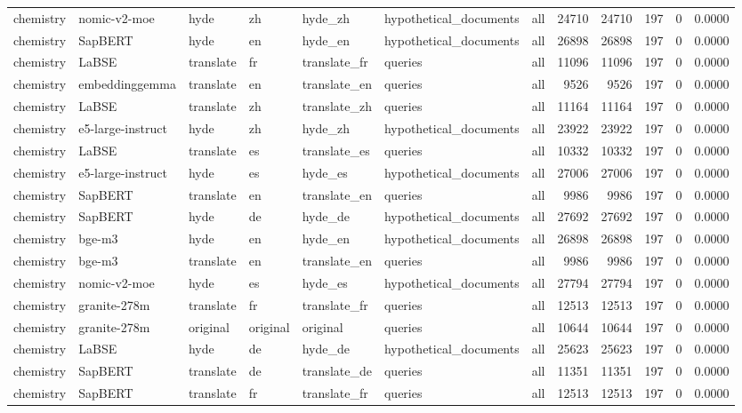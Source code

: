 \begin{tabular}{lllllllrrrrr}
chemistry & nomic-v2-moe & hyde & zh & hyde\_zh & hypothetical\_documents & all & 24710 & 24710 & 197 & 0 & 0.0000 \\
chemistry & SapBERT & hyde & en & hyde\_en & hypothetical\_documents & all & 26898 & 26898 & 197 & 0 & 0.0000 \\
chemistry & LaBSE & translate & fr & translate\_fr & queries & all & 11096 & 11096 & 197 & 0 & 0.0000 \\
chemistry & embeddinggemma & translate & en & translate\_en & queries & all & 9526 & 9526 & 197 & 0 & 0.0000 \\
chemistry & LaBSE & translate & zh & translate\_zh & queries & all & 11164 & 11164 & 197 & 0 & 0.0000 \\
chemistry & e5-large-instruct & hyde & zh & hyde\_zh & hypothetical\_documents & all & 23922 & 23922 & 197 & 0 & 0.0000 \\
chemistry & LaBSE & translate & es & translate\_es & queries & all & 10332 & 10332 & 197 & 0 & 0.0000 \\
chemistry & e5-large-instruct & hyde & es & hyde\_es & hypothetical\_documents & all & 27006 & 27006 & 197 & 0 & 0.0000 \\
chemistry & SapBERT & translate & en & translate\_en & queries & all & 9986 & 9986 & 197 & 0 & 0.0000 \\
chemistry & SapBERT & hyde & de & hyde\_de & hypothetical\_documents & all & 27692 & 27692 & 197 & 0 & 0.0000 \\
chemistry & bge-m3 & hyde & en & hyde\_en & hypothetical\_documents & all & 26898 & 26898 & 197 & 0 & 0.0000 \\
chemistry & bge-m3 & translate & en & translate\_en & queries & all & 9986 & 9986 & 197 & 0 & 0.0000 \\
chemistry & nomic-v2-moe & hyde & es & hyde\_es & hypothetical\_documents & all & 27794 & 27794 & 197 & 0 & 0.0000 \\
chemistry & granite-278m & translate & fr & translate\_fr & queries & all & 12513 & 12513 & 197 & 0 & 0.0000 \\
chemistry & granite-278m & original & original & original & queries & all & 10644 & 10644 & 197 & 0 & 0.0000 \\
chemistry & LaBSE & hyde & de & hyde\_de & hypothetical\_documents & all & 25623 & 25623 & 197 & 0 & 0.0000 \\
chemistry & SapBERT & translate & de & translate\_de & queries & all & 11351 & 11351 & 197 & 0 & 0.0000 \\
chemistry & SapBERT & translate & fr & translate\_fr & queries & all & 12513 & 12513 & 197 & 0 & 0.0000 \\

\end{tabular}
